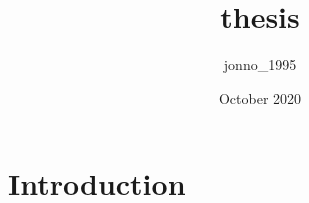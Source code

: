 \documentclass{article}
\title{thesis}
\author{jonno_1995 }
\date{October 2020}
\begin{document}
\maketitle

\section{Introduction}
\end{document}
